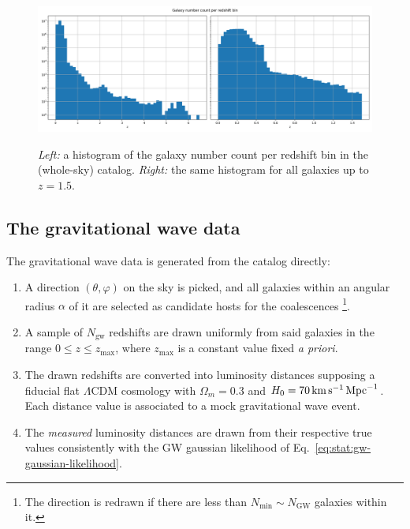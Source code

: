 \documentclass[%
preprint,
nofootinbib,
 amsmath,amssymb,
 aps,
]{revtex4-2}
\begin{document}
\begin{figure}[!ht]
	\caption{\textit{Left:} a histogram of the galaxy number count per redshift bin in the (whole-sky) catalog. \textit{Right:} the same histogram for all galaxies up to $z=1.5$.}
	\centering
	\includegraphics[width=\textwidth]{../src/figures/galaxy-redshift-distribution.png}
	\label{fig:galaxy-redshift-distribution}
\end{figure}

\subsection{The gravitational wave data}

The gravitational wave data is generated from the catalog directly:

\begin{enumerate}
	\item A direction $(\theta, \varphi)$ on the sky is picked, and all galaxies within an angular radius
	      $\alpha$ of it are selected as candidate hosts for the coalescences \footnote{The direction is
		      redrawn if there are less than $N_{\text{min}} \sim N_\text{GW}$ galaxies within it.}.
	\item A sample of $N_\text{gw}$ redshifts are drawn uniformly from said galaxies in the range $0 \leq z
		      \leq z_\text{max}$, where $z_\text{max}$ is a constant value fixed \textit{a priori}.
	\item The drawn redshifts are converted into  luminosity distances supposing a fiducial flat
	      $\Lambda$CDM cosmology with $\Omega_m = 0.3$ and $H_0 = 70 \, \rm{km} \, \rm{s}^{-1} \,
		      \rm{Mpc}^{-1}$. Each distance value is associated to a mock gravitational wave event.
	\item The \textit{measured} luminosity distances are drawn from their respective true values consistently
	      with the GW gaussian likelihood of Eq.~\eqref{eq:stat:gw-gaussian-likelihood}.

\end{enumerate}
\end{document}
